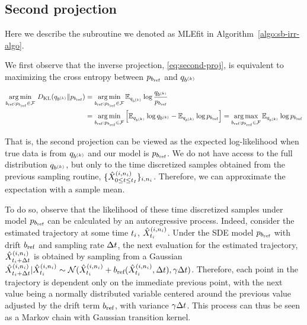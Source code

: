 \subsection{Second projection}
\label{app:inverseproj}
Here we describe the subroutine we denoted as MLEfit in Algorithm~\ref{algo:sb-irr-algo}. 

We first observe that the inverse projection, \cref{eq:second-proj}, is equivalent to maximizing the cross entropy between $\refden_{\refdrift}$ and $\bridge_{\drift^{(\iteralgo)}}$

\begin{align*}
    \argmin_{\refdrift: \refden_{\refdrift}\in\modelfamily} \, \KL(\bridge_{\drift^{(\iteralgo)}} \| \refden_{\refdrift}) &= \argmin_{\refdrift: \refden_{\refdrift}\in\modelfamily} \E_{\bridge_{\drift^{(\iteralgo)}}}\log \frac{\bridge_{\drift^{(\iteralgo)}}}{\refden_{\refdrift}} \\
    &= \argmin_{\refdrift: \refden_{\refdrift}\in\modelfamily}\left[\E_{\bridge_{\drift^{(\iteralgo)}}}\log \bridge_{\drift^{(\iteralgo)}}-\E_{\bridge_{\drift^{(\iteralgo)}}}\log \refden_{\refdrift}\right] = \argmax_{\refdrift: \refden_{\refdrift}\in\modelfamily} \E_{\bridge_{\drift^{(\iteralgo)}}}\log \refden_{\refdrift}
\end{align*}

That is, the second projection can be viewed as the expected log-likelihood when true data is from $\bridge_{\drift^{(\iteralgo)}}$ and our model is $\refden_{\refdrift}$. We do not have access to the full distribution $\bridge_{\drift^{(\iteralgo)}}$, but only to the time discretized samples obtained from the previous sampling routine, $\{\simulatedresponseat{0\le \timet\le \timestep{\totsteps}}^{(\timeidx,\sampleidx_{\timeidx})}\}_{\timeidx,\sampleidx_{\timeidx}}$. Therefore, we can approximate the expectation with a sample mean.


To do so, observe that the likelihood of these time discretized samples under model $\refden_{\refdrift}$ can be calculated by an autoregressive process. Indeed, consider the estimated trajectory at some time $t_{i}$, $\simulatedresponseat{\timet_{\timeidx}}^{ (\timeidx,\sampleidx_{\timeidx}) }$. Under the SDE model $\refden_{\refdrift}$ with drift $\refdrift$ and sampling rate $\Delta t$, the next evaluation for the estimated trajectory, $\simulatedresponseat{\timet_{\timeidx} + \Delta\timet}^{ (\timeidx,\sampleidx_{\timeidx}) }$ is obtained by sampling from a Gaussian $\simulatedresponseat{\timet_{\timeidx} + \Delta\timet}^{ (\timeidx,\sampleidx_{\timeidx}) }|\simulatedresponseat{\timet_{\timeidx}}^{ (\timeidx,\sampleidx_{\timeidx}) }\sim \gN(\simulatedresponseat{\timet_{\timeidx}}^{ (\timeidx,\sampleidx_{\timeidx}) }+\refdrift(\simulatedresponseat{\timet_{\timeidx}}^{ (\timeidx,\sampleidx_{\timeidx}) }, \Delta\timet),\volatility \Delta\timet)$. Therefore, each point in the trajectory is dependent only on the immediate previous point, with the next value being a normally distributed variable centered around the previous value adjusted by the drift term 
$\refdrift$, with variance $\gamma \Delta t$. This process can thus be seen as a Markov chain with Gaussian transition kernel. 

